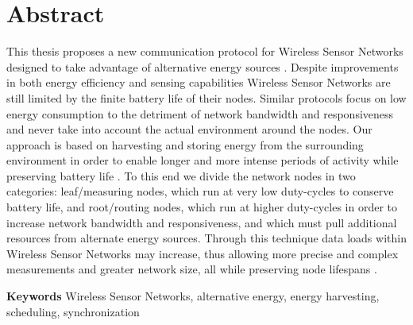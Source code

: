 
\chapter*{Abstract}

This thesis proposes a new communication protocol for Wireless Sensor Networks
designed to take advantage of alternative energy sources . Despite improvements
in both energy efficiency and sensing capabilities Wireless Sensor Networks are
still limited by the finite battery life of their nodes. Similar protocols
focus on low energy consumption to the detriment of network bandwidth and
responsiveness and never take into account the actual environment around the
nodes. Our approach is based on harvesting and storing energy from the
surrounding environment in order to enable longer and more intense periods of
activity while preserving battery life . To this end we divide the network
nodes in two categories: leaf/measuring nodes, which run at very low
duty-cycles to conserve battery life, and root/routing nodes, which run at
higher duty-cycles in order to increase network bandwidth and responsiveness,
and which must pull  additional resources  from alternate energy sources. Through this
technique data loads within Wireless Sensor Networks may increase, thus
allowing more precise and complex measurements and greater network size, all
while preserving node lifespans .

\vspace{\baselineskip}

\textbf{Keywords} Wireless Sensor Networks, alternative energy, energy
harvesting, scheduling, synchronization


